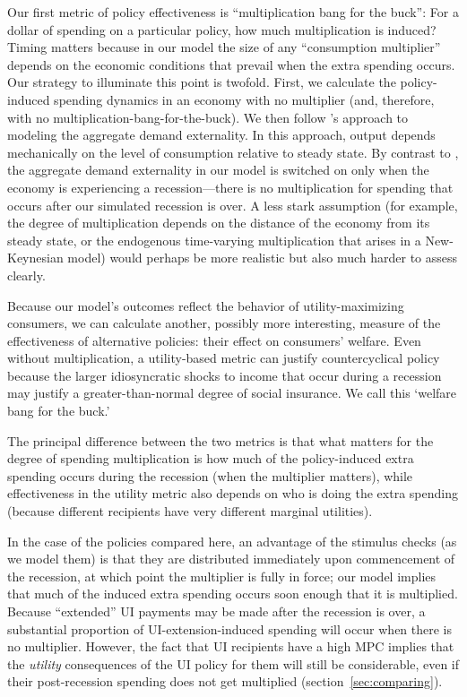 \documentclass[\econtexRoot/HAFiscal]{subfiles}
\begin{document}
Our first metric of policy effectiveness is ``multiplication bang for the buck'': For a dollar of spending on a particular policy, how much multiplication is induced?  Timing matters because in our model the size of any ``consumption multiplier'' depends on the economic conditions that prevail when the extra spending occurs.  Our strategy to illuminate this point is twofold.  First, we calculate the policy-induced spending dynamics in an economy with no multiplier (and, therefore, with no multiplication-bang-for-the-buck).  We then follow \cite{kmpHandbook2016}'s approach to modeling the aggregate demand externality.  In this approach, output depends mechanically on the level of consumption relative to steady state. By contrast to \cite{kmpHandbook2016}, the aggregate demand externality in our model is switched on only when the economy is experiencing a recession---there is no multiplication for spending that occurs after our simulated recession is over.  A less stark assumption (for example, the degree of multiplication depends on the distance of the economy from its steady state, or the endogenous time-varying multiplication that arises in a New-Keynesian model) would perhaps be more realistic but also much harder to assess clearly.   

Because our model's outcomes reflect the behavior of utility-maximizing consumers, we can calculate another, possibly more interesting, measure of the effectiveness of alternative policies:  their effect on consumers' welfare.  Even without multiplication, a utility-based metric can justify countercyclical policy because the larger idiosyncratic shocks to income that occur during a recession may justify a greater-than-normal degree of social insurance.  We call this `welfare bang for the buck.'

The principal difference between the two metrics is that what matters for the degree of spending multiplication is how much of the policy-induced extra spending occurs during the recession (when the multiplier matters), while effectiveness in the utility metric also depends on who is doing the extra spending (because different recipients have very different marginal utilities).

In the case of the policies compared here, an advantage of the stimulus checks (as we model them) is that they are distributed immediately upon commencement of the recession, at which point the multiplier is fully in force; our model implies that much of the induced extra spending occurs soon enough that it is multiplied.  Because ``extended'' UI payments may be made after the recession is over, a substantial proportion of UI-extension-induced spending will occur when there is no multiplier.  However, the fact that UI recipients have a high MPC implies that the \textit{utility} consequences of the UI policy for them will still be considerable, even if their post-recession spending does not get multiplied (section~\ref{sec:comparing}).
\end{document}

